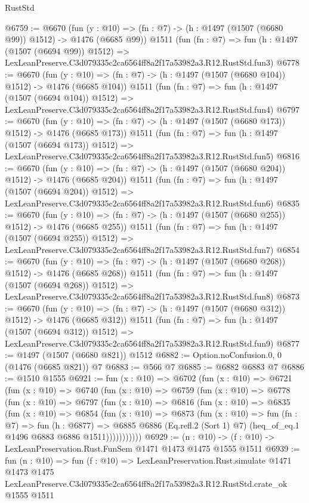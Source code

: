 \begin{lexlean}{RustStd}
\begin{coremodule}
@6759 := @6670
    (fun (y : @10) => (fn : @7) -> (h : @1497 (@1507 (@6680 @99)) @1512) -> @1476 (@6685 @99))
    @1511
    (fun (fn : @7) =>
    fun (h : @1497 (@1507 (@6694 @99)) @1512) =>
    LexLeanPreserve.C3d079335c2ca6564ff8a2f17a53982a3.R12.RustStd.fun3)
@6778 := @6670
    (fun (y : @10) => (fn : @7) -> (h : @1497 (@1507 (@6680 @104)) @1512) -> @1476 (@6685 @104))
    @1511
    (fun (fn : @7) =>
    fun (h : @1497 (@1507 (@6694 @104)) @1512) =>
    LexLeanPreserve.C3d079335c2ca6564ff8a2f17a53982a3.R12.RustStd.fun4)
@6797 := @6670
    (fun (y : @10) => (fn : @7) -> (h : @1497 (@1507 (@6680 @173)) @1512) -> @1476 (@6685 @173))
    @1511
    (fun (fn : @7) =>
    fun (h : @1497 (@1507 (@6694 @173)) @1512) =>
    LexLeanPreserve.C3d079335c2ca6564ff8a2f17a53982a3.R12.RustStd.fun5)
@6816 := @6670
    (fun (y : @10) => (fn : @7) -> (h : @1497 (@1507 (@6680 @204)) @1512) -> @1476 (@6685 @204))
    @1511
    (fun (fn : @7) =>
    fun (h : @1497 (@1507 (@6694 @204)) @1512) =>
    LexLeanPreserve.C3d079335c2ca6564ff8a2f17a53982a3.R12.RustStd.fun6)
@6835 := @6670
    (fun (y : @10) => (fn : @7) -> (h : @1497 (@1507 (@6680 @255)) @1512) -> @1476 (@6685 @255))
    @1511
    (fun (fn : @7) =>
    fun (h : @1497 (@1507 (@6694 @255)) @1512) =>
    LexLeanPreserve.C3d079335c2ca6564ff8a2f17a53982a3.R12.RustStd.fun7)
@6854 := @6670
    (fun (y : @10) => (fn : @7) -> (h : @1497 (@1507 (@6680 @268)) @1512) -> @1476 (@6685 @268))
    @1511
    (fun (fn : @7) =>
    fun (h : @1497 (@1507 (@6694 @268)) @1512) =>
    LexLeanPreserve.C3d079335c2ca6564ff8a2f17a53982a3.R12.RustStd.fun8)
@6873 := @6670
    (fun (y : @10) => (fn : @7) -> (h : @1497 (@1507 (@6680 @312)) @1512) -> @1476 (@6685 @312))
    @1511
    (fun (fn : @7) =>
    fun (h : @1497 (@1507 (@6694 @312)) @1512) =>
    LexLeanPreserve.C3d079335c2ca6564ff8a2f17a53982a3.R12.RustStd.fun9)
@6877 := @1497 (@1507 (@6680 @821)) @1512
@6882 := Option.noConfusion.{0, 0} (@1476 (@6685 @821)) @7
@6883 := @566 @7
@6885 := @6882 @6883 @7
@6886 := @1510 @1555
@6921 := fun (x : @10) =>
  @6702
    (fun (x : @10) =>
    @6721
      (fun (x : @10) =>
      @6740
        (fun (x : @10) =>
        @6759
          (fun (x : @10) =>
          @6778
            (fun (x : @10) =>
            @6797
              (fun (x : @10) =>
              @6816
                (fun (x : @10) =>
                @6835
                  (fun (x : @10) =>
                  @6854
                    (fun (x : @10) =>
                    @6873
                      (fun (x : @10) =>
                      fun (fn : @7) =>
                      fun (h : @6877) =>
                      @6885
                        @6886
                        (Eq.refl.{2} (Sort 1) @7)
                        (heq_of_eq.{1} @1496 @6883 @6886 @1511)))))))))))
@6929 := (n : @10) -> (f : @10) -> LexLeanPreservation.Rust.FunSem @1471 @1473 @1475 @1555 @1511
@6939 := fun (n : @10) =>
  fun (f : @10) =>
  LexLeanPreservation.Rust.simulate
    @1471
    @1473
    @1475
    LexLeanPreserve.C3d079335c2ca6564ff8a2f17a53982a3.R12.RustStd.crate_ok
    @1555
    @1511
\end{coremodule}
\end{lexlean}
